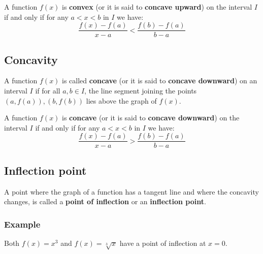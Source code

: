 \documentclass[11pt]{article}
\begin{document}
\begin{center}
\end{center}

A function \(f(x)\) is \textbf{convex} (or it is said to \textbf{concave upward}) on the interval \(I\) if and only if for any \(a < x < b\) in \(I\) we have:
\[\frac{f(x) - f(a)}{x - a} < \frac{f(b) - f(a)}{b - a}\]

\newpage
\subsection{Concavity}
\label{sec:org9a6cc69}
A function \(f(x)\) is called \textbf{concave} (or it is said to \textbf{concave downward}) on an interval \(I\) if for all \(a, b \in I\), the line segment joining the points \((a, f(a)), (b, f(b))\) lies above the graph of \(f(x)\).


\begin{center}
\end{center}

A function \(f(x)\) is \textbf{concave} (or it is said to \textbf{concave downward}) on the interval \(I\) if and only if for any \(a < x < b\) in \(I\) we have:
\[\frac{f(x) - f(a)}{x - a} > \frac{f(b) - f(a)}{b - a}\]

\newpage
\subsection{Inflection point}
\label{sec:org29e4f7d}
A point where the graph of a function has a tangent line and where the concavity changes, is called a \textbf{point of inflection} or an \textbf{inflection point}.
\subsubsection{Example}
\label{sec:orgef2563d}
Both \(f(x) = x^3\) and \(f(x) =\sqrt[3]{x}\) have a point of inflection at \(x = 0\).
\end{document}
